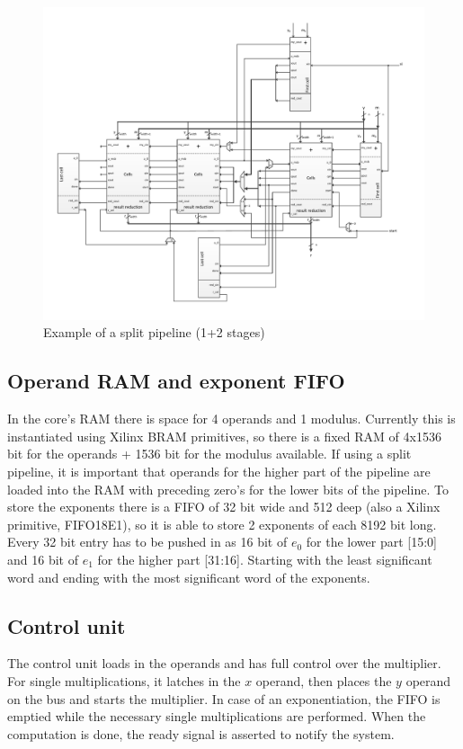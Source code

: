 \newpage 
\begin{figure}[H]
\centering
\includegraphics[trim=1.2cm 1.2cm 1.2cm 1.2cm, width=22cm, angle=90]{pictures/sys_pipeline.pdf}
\caption{Example of a split pipeline (1+2 stages)}
\label{pipeline_structure_split}
\end{figure}
\newpage


\subsection{Operand RAM and exponent FIFO}
In the core's RAM there is space for 4 operands and 1 modulus. Currently this is instantiated using Xilinx BRAM
primitives, so there is a fixed RAM of 4x1536 bit for the operands + 1536 bit for the modulus available. If using a split
pipeline, it is important that operands for the higher part of the pipeline are loaded into the RAM with preceding
zero's for the lower bits of the pipeline. To store the exponents there is a FIFO of 32 bit wide and 512 deep (also a
Xilinx primitive, FIFO18E1), so it is able to store 2 exponents of each 8192 bit long. Every 32 bit entry has to be
pushed in as 16 bit of $e_0$ for the lower part [15:0] and 16 bit of $e_1$ for the higher part [31:16]. Starting
with the least significant word and ending with the most significant word of the exponents.

\subsection{Control unit}
The control unit loads in the operands and has full control over the multiplier. For single multiplications, it latches in 
the $x$ operand, then places the $y$ operand on the bus and starts the multiplier. In case of an exponentiation, the FIFO is 
emptied while the necessary single multiplications are performed. When the computation is done, the ready signal is 
asserted to notify the system.


